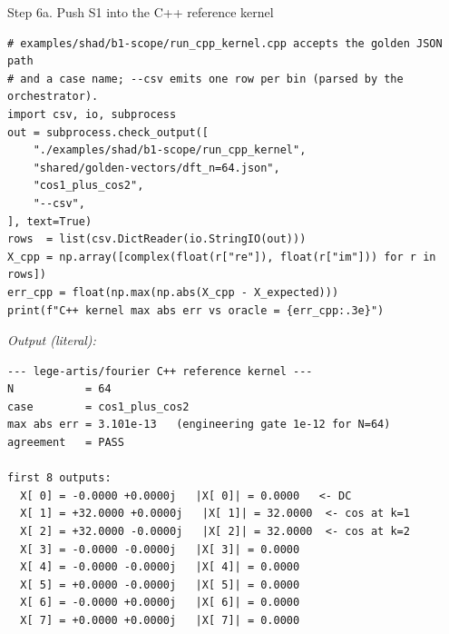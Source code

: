 \documentclass[11pt,a4paper,openany]{book}
\begin{document}
\begin{pipelinestep}{Step 6a. Push S1 into the C++ reference kernel}
\begin{lstlisting}[style=shadpython]
# examples/shad/b1-scope/run_cpp_kernel.cpp accepts the golden JSON path
# and a case name; --csv emits one row per bin (parsed by the orchestrator).
import csv, io, subprocess
out = subprocess.check_output([
    "./examples/shad/b1-scope/run_cpp_kernel",
    "shared/golden-vectors/dft_n=64.json",
    "cos1_plus_cos2",
    "--csv",
], text=True)
rows  = list(csv.DictReader(io.StringIO(out)))
X_cpp = np.array([complex(float(r["re"]), float(r["im"])) for r in rows])
err_cpp = float(np.max(np.abs(X_cpp - X_expected)))
print(f"C++ kernel max abs err vs oracle = {err_cpp:.3e}")
\end{lstlisting}
\textit{Output (literal):}
\begin{lstlisting}[style=shaddata]
--- lege-artis/fourier C++ reference kernel ---
N           = 64
case        = cos1_plus_cos2
max abs err = 3.101e-13   (engineering gate 1e-12 for N=64)
agreement   = PASS

first 8 outputs:
  X[ 0] = -0.0000 +0.0000j   |X[ 0]| = 0.0000   <- DC
  X[ 1] = +32.0000 +0.0000j   |X[ 1]| = 32.0000  <- cos at k=1
  X[ 2] = +32.0000 -0.0000j   |X[ 2]| = 32.0000  <- cos at k=2
  X[ 3] = -0.0000 -0.0000j   |X[ 3]| = 0.0000
  X[ 4] = -0.0000 -0.0000j   |X[ 4]| = 0.0000
  X[ 5] = +0.0000 -0.0000j   |X[ 5]| = 0.0000
  X[ 6] = -0.0000 +0.0000j   |X[ 6]| = 0.0000
  X[ 7] = +0.0000 +0.0000j   |X[ 7]| = 0.0000
\end{lstlisting}
\end{pipelinestep}
\end{document}
